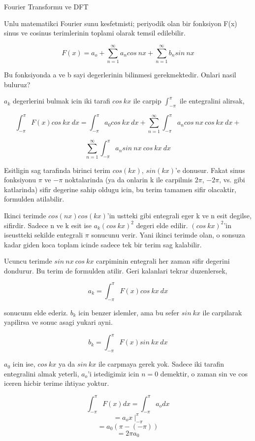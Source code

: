\documentclass[12pt,fleqn]{article}
\begin{document}
Fourier Transformu ve DFT

Unlu matematikci Fourier sunu kesfetmisti; periyodik olan bir fonksiyon F(x)
sinus ve cosinus terimlerinin toplami olarak temsil edilebilir.

\[ F(x) = a_o + \sum_{n=1}^{\infty}a_ncos \ nx + \sum_{n=1}^{\infty}b_nsin \ nx  \]

Bu fonksiyonda a ve b sayi degerlerinin bilinmesi gerekmektedir. Onlari nasil
buluruz? 

$a_k$ degerlerini bulmak icin iki tarafi $cos \ kx$ ile carpip
$\int_{-\pi}^{\pi}$ ile entegralini alirsak,

\[ \int_{-\pi}^{\pi} F(x)cos \ kx \ dx = \int_{-\pi}^{\pi} a_0 cos \
kx \ dx +  \sum_{n=1}^{\infty}\int_{-\pi}^{\pi} a_ncos \ nx \ cos \ kx \ dx +   \]

\[ \sum_{n=1}^{\infty}\int_{-\pi}^{\pi} a_nsin \ nx \ cos \ kx \ dx   \]

Esitligin sag tarafinda birinci terim $cos(kx)$, $sin(kx)$'e donusur. Fakat sinus
fonksiyonu $\pi$ ve $-\pi$ noktalarinda (ya da onlarin k ile carpilmis $2\pi$,
$-2\pi$, vs. gibi katlarinda) sifir degerine sahip oldugu icin, bu terim tamamen
sifir olacaktir, formulden atilabilir.

Ikinci terimde $cos(nx)cos(kx)$'in ustteki gibi entegrali eger k ve n esit
degilse, sifirdir. Sadece n ve k esit ise $a_k(cos \ kx)^2$ degeri elde edilir.
$(cos \ kx)^2$'in iseustteki sekilde entegrali $\pi$ sonucunu verir. Yani ikinci
terimde olan, o sonsuza kadar giden koca toplam icinde sadece tek bir terim sag
kalabilir.

Ucuncu terimde $sin \ nx \ cos \ kx$ carpiminin entegrali her zaman
sifir degerini dondurur. Bu terim de formulden atilir. Geri kalanlari tekrar
duzenlersek, 

\[ a_k = \int_{-\pi}^{\pi} F(x)cos \ kx \ dx \]

sonucunu elde ederiz. $b_k$ icin benzer islemler, ama bu sefer $sin \ kx$ ile carpilarak yapilirsa ve
sonuc asagi yukari ayni.

\[ b_k = \int_{-\pi}^{\pi} F(x)sin \ kx \ dx \]

$a_0$ icin ise, $cos \ kx$ ya da $sin \ kx$ ile carpmaya gerek yok. Sadece iki
tarafin entegralini almak yeterli, $a_o$'i istedigimiz icin $n=0$ demektir, o
zaman sin ve cos iceren hicbir terime ihtiyac yoktur.

\[  \int_{-\pi}^{\pi} F(x) dx =  \int_{-\pi}^{\pi} a_o dx \]
\[  =  a_o x \ \bigg|_{-\pi}^{\pi}  \]
\[  = a_0 (\pi -(-\pi))  \]
\[  = 2\pi a_0  \]
\end{document}
